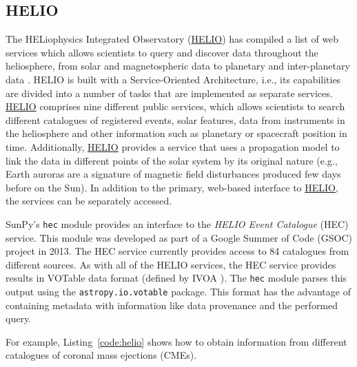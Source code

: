 \subsection{HELIO}\label{ssec:helio}

The HELiophysics Integrated Observatory (\href{http://helio-vo.eu}{HELIO}) has 
compiled a list of web services which allows scientists to query and 
discover data throughout the heliosphere, from solar and magnetospheric data to planetary and 
inter-planetary data \citep{dps2012}.
HELIO is built with a Service-Oriented Architecture, 
i.e., its capabilities are divided into a number of tasks that are 
implemented as separate services. 
\href{http://helio-vo.eu}{HELIO} comprises nine different public services, 
which allows scientists to search different catalogues of registered events, 
solar features, data from instruments in the heliosphere and other information 
such as planetary or spacecraft position in time. 
Additionally, \href{http://helio-vo.eu}{HELIO} provides a service that uses a 
propagation model to link the data in different points of the solar system by 
its original nature (e.g., Earth auroras are a signature of magnetic 
field disturbances produced few days before on the Sun).
In addition to the primary, web-based interface to 
\href{http://helio-vo.eu}{HELIO}, the services can be separately accessed.

SunPy's \texttt{hec} module provides an interface to the
\textit{HELIO Event Catalogue} (HEC) service. This module was developed as
part of a Google Summer of Code (GSOC) project in 2013.
The HEC service currently provides access to 84 catalogues from different
sources.
As with all of the HELIO services, the HEC service provides results in VOTable 
data format (defined by IVOA \cite{ochsenbein_ivoa_2011}). The \texttt{hec}
module parses this output using the \texttt{astropy.io.votable} package.
This format has the advantage of containing metadata with information like
data provenance and the performed query.

For example, Listing~\ref{code:helio} shows how to obtain information
from different catalogues of coronal mass ejections (CMEs).

